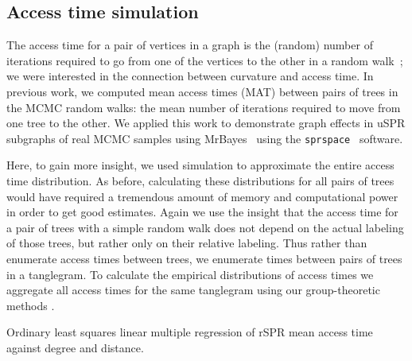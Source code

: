 \documentclass[11pt,onecolumn,conference]{IEEEtran}
\let\MYoriglatexcaption\caption
\renewcommand{\caption}[2][\relax]{\MYoriglatexcaption[#2]{#2}}
\begin{document}
\subsection{Access time simulation}
The access time for a pair of vertices in a graph is the (random) number of iterations required to go from one of the vertices to the other in a random walk~\cite{lovasz1993random}; we were interested in the connection between curvature and access time.
In previous work, we computed mean access times (MAT) between pairs of trees in the MCMC random walks: the mean number of iterations required to move from one tree to the other.
We applied this work to demonstrate graph effects in uSPR subgraphs of real MCMC samples using MrBayes~\cite{Whidden2015-yi} using the \texttt{sprspace}~\cite{sprspace} software.

Here, to gain more insight, we used simulation to approximate the entire access time distribution.
As before, calculating these distributions for all pairs of trees would have required a tremendous amount of memory and computational power in order to get good estimates.
Again we use the insight that the access time for a pair of trees with a simple random walk does not depend on the actual labeling of those trees, but rather only on their relative labeling.
Thus rather than enumerate access times between trees, we enumerate times between pairs of trees in a tanglegram.
To calculate the empirical distributions of access times we aggregate all access times for the same tanglegram using our group-theoretic methods \cite{tangle}.

\begin{table}
\centering
\caption{Ordinary least squares linear multiple regression of rSPR mean access time against degree and distance.}
\label{tab:regressionMAT}
\end{table}
\end{document}
